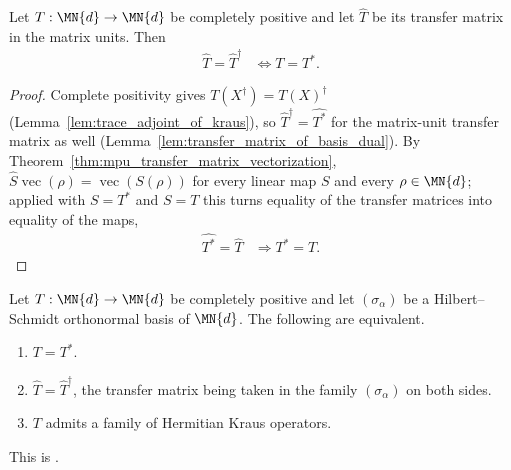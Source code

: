\begin{lemma}
    \label{lem:transfer_matrix_units_hermitian_iff}
    \leanok
    Let $T:\MN{d}\to\MN{d}$ be completely positive and let $\widehat T$ be its
    transfer matrix in the matrix units. Then
    \begin{align}
        \widehat T=\widehat T^\dagger
        &\iff T=T^*.
    \end{align}
\end{lemma}

\begin{proof}\leanok
    Complete positivity gives $T(X^\dagger)=T(X)^\dagger$
    (Lemma~\ref{lem:trace_adjoint_of_kraus}), so
    $\widehat T^\dagger=\widehat{T^*}$ for the matrix-unit transfer matrix as
    well (Lemma~\ref{lem:transfer_matrix_of_basis_dual}). By
    Theorem~\ref{thm:mpu_transfer_matrix_vectorization},
    $\widehat S\operatorname{vec}(\rho)=\operatorname{vec}(S(\rho))$ for every
    linear map $S$ and every $\rho\in\MN{d}$; applied with $S=T^*$ and $S=T$
    this turns equality of the transfer matrices into equality of the maps,
    \begin{align}
        \widehat{T^*}=\widehat T
        &\Rightarrow T^*=T.
    \end{align}
\end{proof}

\begin{theorem}
    \label{thm:self_dual_channels}
    \leanok
    Let $T:\MN{d}\to\MN{d}$ be completely positive and let $(\sigma_\alpha)$ be a
    Hilbert--Schmidt orthonormal basis of $\MN{d}$. The following are equivalent.
    \begin{enumerate}
        \item $T=T^*$.
        \item $\widehat T=\widehat T^\dagger$, the transfer matrix being taken in
            the family $(\sigma_\alpha)$ on both sides.
        \item $T$ admits a family of Hermitian Kraus operators.
    \end{enumerate}
    This is \cite[Proposition~2.6]{Wolf2012Quantum}.
\end{theorem}


